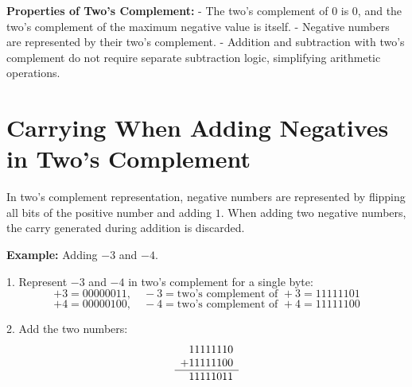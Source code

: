 \documentclass{report}
\begin{document}
\begin{center}
\end{center}

\textbf{Properties of Two's Complement:}
- The two's complement of \(0\) is \(0\), and the two's complement of the maximum negative value is itself.
- Negative numbers are represented by their two's complement.
- Addition and subtraction with two's complement do not require separate subtraction logic, simplifying arithmetic operations.

\section{Carrying When Adding Negatives in Two's Complement}

In two's complement representation, negative numbers are represented by flipping all bits of the positive number and adding \(1\). When adding two negative numbers, the carry generated during addition is discarded.

\textbf{Example:} Adding \(-3\) and \(-4\).

1. Represent \(-3\) and \(-4\) in two's complement for a single byte:
   \[
   +3 = 00000011, \quad -3 = \text{two's complement of } +3 = 11111101
   \]
   \[
   +4 = 00000100, \quad -4 = \text{two's complement of } +4 = 11111100
   \]

2. Add the two numbers:
   \[
   \begin{array}{c@{}c@{}c@{}c@{}c@{}c@{}c@{}c@{}c}
       & 1 & 1 & 1 & 1 & 1 & 1 & 1 & 0 \\ 
     + & 1 & 1 & 1 & 1 & 1 & 1 & 0 & 0 \\ \hline
       & 1 & 1 & 1 & 1 & 1 & 0 & 1 & 1 \\ 
   \end{array}
   \]
\end{document}
